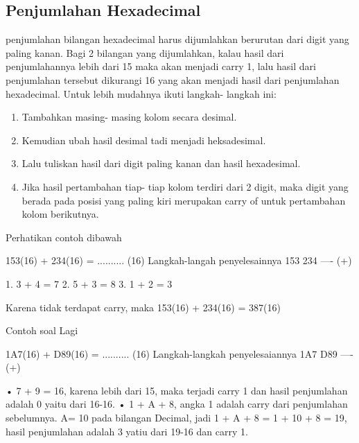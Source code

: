 \subsection {Penjumlahan Hexadecimal}
penjumlahan bilangan hexadecimal harus dijumlahkan berurutan dari digit yang paling kanan. Bagi 2 bilangan yang dijumlahkan, kalau hasil dari penjumlahannya lebih dari 15 maka akan menjadi carry 1, lalu hasil dari penjumlahan tersebut dikurangi 16 yang akan menjadi hasil dari penjumlahan hexadecimal.
Untuk lebih mudahnya ikuti langkah- langkah ini:
\begin{enumerate}
	\item Tambahkan masing- masing kolom secara desimal.
	\item Kemudian ubah hasil desimal tadi menjadi heksadesimal.
	\item Lalu tuliskan hasil dari digit paling kanan dan hasil hexadesimal.
	\item Jika hasil pertambahan tiap- tiap kolom terdiri dari 2 digit, maka digit yang berada pada posisi yang paling kiri merupakan carry of untuk pertambahan kolom berikutnya.
\end{enumerate}
 Perhatikan contoh dibawah

153(16) + 234(16) = .......... (16) 
Langkah-langah penyelesainnya
153 
234 
---- (+)

1. 3 + 4 = 7
2. 5 + 3 = 8
3. 1 + 2 = 3

Karena tidak terdapat carry, maka 153(16) + 234(16) = 387(16)

Contoh soal Lagi 

1A7(16) + D89(16) = .......... (16)
Langkah-langkah penyelesaiannya
1A7
D89
---- (+)

•	7 + 9 = 16, karena lebih dari 15, maka terjadi carry 1 dan hasil penjumlahan adalah 0 yaitu dari 16-16.
•	1 + A + 8, angka 1 adalah carry dari penjumlahan sebelumnya. A= 10 pada bilangan Decimal, jadi 1 + A + 8 = 1 + 10 + 8 = 19, hasil penjumlahan adalah 3 yatiu dari 19-16 dan carry 1.


